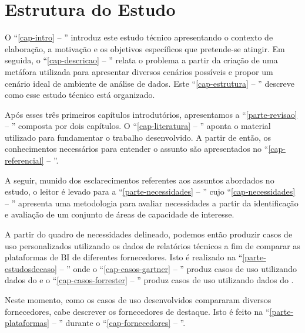 \chapter{Estrutura do Estudo}
\label{cap-estrutura}

    O ``\autoref{cap-intro} -- '' introduz este estudo técnico apresentando o contexto de elaboração, a motivação e os objetivos específicos que pretende-se atingir. Em seguida, o ``\autoref{cap-descricao} -- '' relata o problema a partir da criação de uma metáfora utilizada para apresentar diversos cenários possíveis e propor um cenário ideal de ambiente de análise de dados. Este ``\autoref{cap-estrutura} -- '' descreve como esse estudo técnico está organizado.
    
    Após esses três primeiros capítulos introdutórios, apresentamos a ``\autoref{parte-revisao} -- '' composta por dois capítulos.
    O ``\autoref{cap-literatura} -- '' aponta o material utilizado para fundamentar o trabalho desenvolvido. A partir de então, os conhecimentos necessários para entender o assunto são apresentados no ``\autoref{cap-referencial} -- ''.  
    
    A seguir, munido dos esclarecimentos referentes aos assuntos abordados no estudo, o leitor é levado para a ``\autoref{parte-necessidades} -- '' cujo ``\autoref{cap-necessidades} -- '' apresenta uma metodologia para avaliar necessidades a partir da identificação e avaliação de um conjunto de áreas de capacidade de interesse.
    
    A partir do quadro de necessidades delineado, podemos então produzir casos de uso personalizados utilizando os dados de relatórios técnicos a fim de comparar as plataformas de BI de diferentes fornecedores. Isto é realizado na ``\autoref{parte-estudosdecaso} -- '' onde o ``\autoref{cap-casos-gartner} -- '' produz casos de uso utilizando dados do \relGCC \xspace e o ``\autoref{cap-casos-forrester} -- '' produz casos de uso utilizando dados do \relFCM.
    
    Neste momento, como os casos de uso desenvolvidos compararam diversos fornecedores, cabe descrever os fornecedores de destaque. Isto é feito na ``\autoref{parte-plataformas} -- '' durante o  ``\autoref{cap-fornecedores} -- ''.  
    
